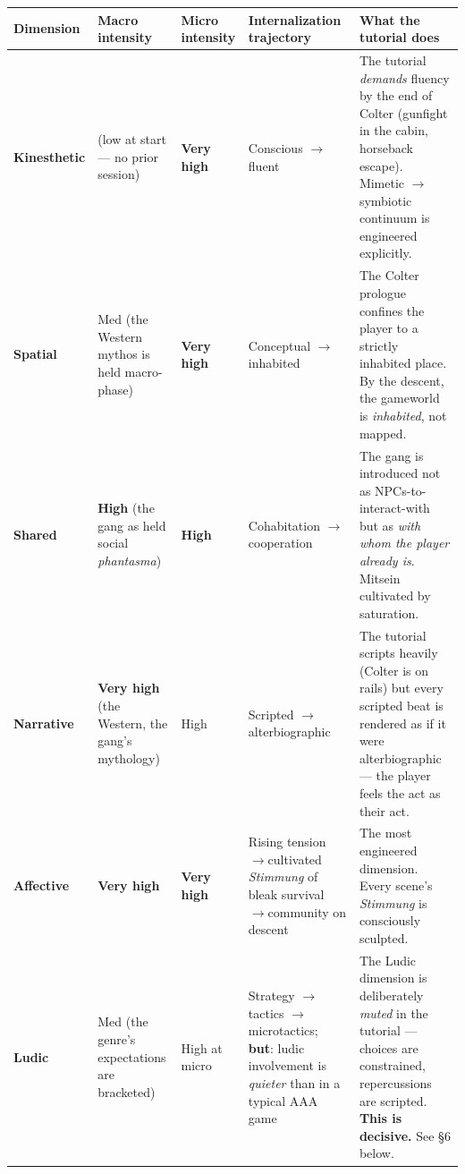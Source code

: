 \documentclass[11pt]{report}
\begin{document}
\begin{table}[H]
\small
\renewcommand{\arraystretch}{1.25}
\begin{tabularx}{\textwidth}{>{\RaggedRight\arraybackslash}X>{\RaggedRight\arraybackslash}X>{\RaggedRight\arraybackslash}X>{\RaggedRight\arraybackslash}X>{\RaggedRight\arraybackslash}X}
\toprule
Dimension & Macro intensity & Micro intensity & Internalization trajectory & What the tutorial does \\
\midrule
\textbf{Kinesthetic} & (low at start — no prior session) & \textbf{Very high} & Conscious $\rightarrow$\allowbreak  fluent & The tutorial \textit{demands} fluency by the end of Colter (gunfight in the cabin, horseback escape). Mimetic $\rightarrow$\allowbreak  symbiotic continuum is engineered explicitly. \\
\textbf{Spatial} & Med (the Western mythos is held macro-phase) & \textbf{Very high} & Conceptual $\rightarrow$\allowbreak  inhabited & The Colter prologue confines the player to a strictly inhabited place. By the descent, the gameworld is \textit{inhabited}, not mapped. \\
\textbf{Shared} & \textbf{High} (the gang as held social \textit{phantasma}) & \textbf{High} & Cohabitation $\rightarrow$\allowbreak  cooperation & The gang is introduced not as NPCs-to-interact-with but as \textit{with whom the player already is}. Mitsein cultivated by saturation. \\
\textbf{Narrative} & \textbf{Very high} (the Western, the gang's mythology) & High & Scripted $\rightarrow$\allowbreak  alterbiographic & The tutorial scripts heavily (Colter is on rails) but every scripted beat is rendered as if it were alterbiographic — the player feels the act as their act. \\
\textbf{Affective} & \textbf{Very high} & \textbf{Very high} & Rising tension $\rightarrow$\allowbreak  cultivated \textit{Stimmung} of bleak survival $\rightarrow$\allowbreak  community on descent & The most engineered dimension. Every scene's \textit{Stimmung} is consciously sculpted. \\
\textbf{Ludic} & Med (the genre's expectations are bracketed) & High at micro & Strategy $\rightarrow$\allowbreak  tactics $\rightarrow$\allowbreak  microtactics; \textbf{but}: ludic involvement is \textit{quieter} than in a typical AAA game & The Ludic dimension is deliberately \textit{muted} in the tutorial — choices are constrained, repercussions are scripted. \textbf{This is decisive.} See §6 below. \\
\bottomrule
\end{tabularx}
\end{table}
\end{document}
